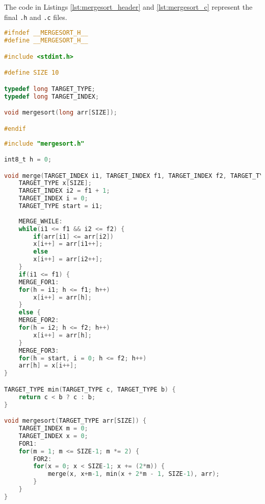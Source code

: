 The code in Listings \ref{lst:mergesort_header} and \ref{lst:mergesort_c} represent the final \texttt{.h} and \texttt{.c} files.

\bigskip

\begin{lstlisting}[label=lst:mergesort_header,caption=Mergesort Header File,language=C,tabsize=4]
#ifndef __MERGESORT_H__
#define __MERGESORT_H__

#include <stdint.h>

#define SIZE 10

typedef long TARGET_TYPE;
typedef long TARGET_INDEX;

void mergesort(long arr[SIZE]);

#endif
\end{lstlisting}

\newpage

\begin{lstlisting}[label=lst:mergesort_c,caption=Mergesort C File,language=C,tabsize=4]
#include "mergesort.h"

int8_t h = 0;

void merge(TARGET_INDEX i1, TARGET_INDEX f1, TARGET_INDEX f2, TARGET_TYPE arr[SIZE]) {
	TARGET_TYPE x[SIZE];
	TARGET_INDEX i2 = f1 + 1;
	TARGET_INDEX i = 0;
	TARGET_TYPE start = i1;
	
	MERGE_WHILE:
	while(i1 <= f1 && i2 <= f2) {
		if(arr[i1] <= arr[i2])
		x[i++] = arr[i1++];
		else
		x[i++] = arr[i2++];
	}	
	if(i1 <= f1) {
	MERGE_FOR1:
	for(h = i1; h <= f1; h++)
		x[i++] = arr[h];
	}
	else {
	MERGE_FOR2:
	for(h = i2;	h <= f2; h++)
		x[i++] = arr[h];
	}
	MERGE_FOR3:
	for(h = start, i = 0; h <= f2; h++)
	arr[h] = x[i++];
}

TARGET_TYPE min(TARGET_TYPE c, TARGET_TYPE b) {
	return c < b ? c : b;
}

void mergesort(TARGET_TYPE arr[SIZE]) {
	TARGET_INDEX m = 0;
	TARGET_INDEX x = 0;
	FOR1:
	for(m = 1; m <= SIZE-1; m *= 2) {
		FOR2:
		for(x = 0; x < SIZE-1; x += (2*m)) {
			merge(x, x+m-1, min(x + 2*m - 1, SIZE-1), arr);
		}
	}
}
\end{lstlisting}













